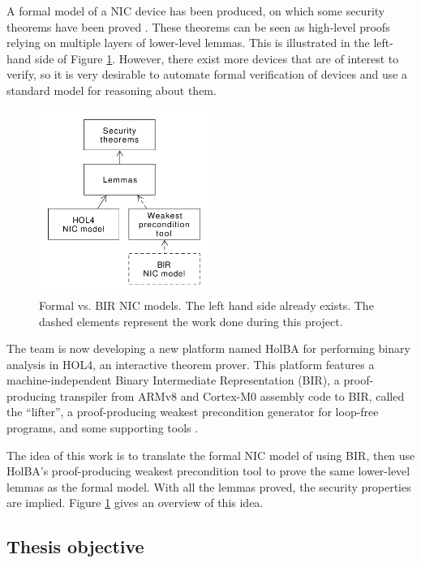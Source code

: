 \documentclass[10pt,a4paper]{article}
\begin{document}
\begin{multicols}{2}
A formal model of a {NIC} device has been produced, on which some security theorems have been proved \cite{haglund_formal_2016,haglund_trustworthy_nodate}. These theorems can be seen as high-level proofs relying on multiple layers of lower-level lemmas. This is illustrated in the left-hand side of Figure \ref{hol-v-bir-nic-model-simple}. However, there exist more devices that are of interest to verify, so it is very desirable to automate formal verification of devices and use a standard model for reasoning about them.
%
\begin{figure}[H]
  \centering
	\includegraphics[height=6cm]{figures/hol-v-bir-nic-model-simple.png}
	\caption{Formal vs. BIR NIC models. The left hand side already exists. The dashed elements represent the work done during this project.}
	\label{hol-v-bir-nic-model-simple}
\end{figure}

The team is now developing a new platform named {HolBA} for performing binary analysis in HOL4, an interactive theorem prover. This platform features a machine-independent Binary Intermediate Representation (BIR), a proof-producing transpiler from ARMv8 and Cortex-M0 assembly code to BIR, called the ``lifter'', a proof-producing weakest precondition generator for loop-free programs, and some supporting tools \cite{metere_sound_2017,lindner_trabin:_2019}.

The idea of this work is to translate the formal {NIC} model of \cite{haglund_formal_2016} using {BIR}, then use HolBA's proof-producing weakest precondition tool to prove the same lower-level lemmas as the formal model. With all the lemmas proved, the security properties are implied. Figure \ref{hol-v-bir-nic-model-simple} gives an overview of this idea.

\subsection{Thesis objective}


\end{multicols}
\end{document}
